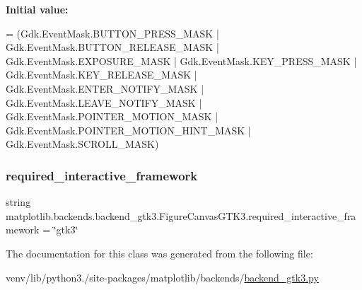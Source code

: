 {\bfseries Initial value\+:}
\begin{DoxyCode}
=  (Gdk.EventMask.BUTTON\_PRESS\_MASK
                  | Gdk.EventMask.BUTTON\_RELEASE\_MASK
                  | Gdk.EventMask.EXPOSURE\_MASK
                  | Gdk.EventMask.KEY\_PRESS\_MASK
                  | Gdk.EventMask.KEY\_RELEASE\_MASK
                  | Gdk.EventMask.ENTER\_NOTIFY\_MASK
                  | Gdk.EventMask.LEAVE\_NOTIFY\_MASK
                  | Gdk.EventMask.POINTER\_MOTION\_MASK
                  | Gdk.EventMask.POINTER\_MOTION\_HINT\_MASK
                  | Gdk.EventMask.SCROLL\_MASK)
\end{DoxyCode}
\mbox{\label{classmatplotlib_1_1backends_1_1backend__gtk3_1_1FigureCanvasGTK3_a2c67390c620a0fb0fbb24eeab5469d60}} 
\subsubsection{\texorpdfstring{required\+\_\+interactive\+\_\+framework}{required\_interactive\_framework}}
{\footnotesize\ttfamily string matplotlib.\+backends.\+backend\+\_\+gtk3.\+Figure\+Canvas\+G\+T\+K3.\+required\+\_\+interactive\+\_\+framework = \char`\"{}gtk3\char`\"{}\hspace{0.3cm}{\ttfamily [static]}}



The documentation for this class was generated from the following file\+:\begin{DoxyCompactItemize}
\item 
venv/lib/python3./site-\/packages/matplotlib/backends/\hyperlink{backend__gtk3_8py}{backend\+\_\+gtk3.\+py}\end{DoxyCompactItemize}
